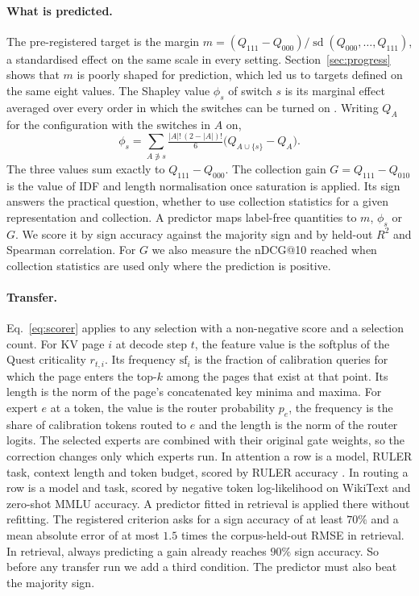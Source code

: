 \documentclass[11pt]{article}
\newcommand{\sfreq}{\mathrm{sf}}
\begin{document}
\paragraph{What is predicted.} The pre-registered target is the margin
$m = (Q_{111} - Q_{000})/\operatorname{sd}(Q_{000}, \ldots, Q_{111})$, a standardised
effect on the same scale in every setting. Section~\ref{sec:progress} shows that $m$ is
poorly shaped for prediction, which led us to targets defined on the same eight values.
The Shapley value $\phi_s$ of switch $s$ is its marginal effect averaged over every order
in which the switches can be turned on \citep{shapley1953value}. Writing $Q_A$ for the
configuration with the switches in $A$ on,
\begin{equation}
\phi_s = \sum_{A \not\ni s}
\tfrac{|A|!\,(2-|A|)!}{6}\bigl(Q_{A\cup\{s\}} - Q_{A}\bigr).
\label{eq:shapley}
\end{equation}
The three values sum exactly to $Q_{111} - Q_{000}$. The collection gain
$G = Q_{111} - Q_{010}$ is the value of IDF and length normalisation once saturation is
applied. Its sign answers the practical question, whether to use collection statistics
for a given representation and collection. A predictor maps label-free quantities to
$m$, $\phi_s$ or $G$. We score it by sign accuracy against the majority sign and by
held-out $R^2$ and Spearman correlation. For $G$ we also measure the nDCG@10 reached when
collection statistics are used only where the prediction is positive.

\paragraph{Transfer.} Eq.~\eqref{eq:scorer} applies to any selection with a non-negative
score and a selection count. For KV page $i$ at decode step $t$, the feature value is the
softplus of the Quest criticality $r_{t,i}$. Its frequency $\sfreq_i$ is the fraction of
calibration queries for which the page enters the top-$k$ among the pages that exist at
that point. Its length is the norm of the page's concatenated key minima and maxima. For
expert $e$ at a token, the value is the router probability $p_e$, the frequency is the
share of calibration tokens routed to $e$ and the length is the norm of the router logits.
The selected experts are combined with their original gate weights, so the correction
changes only which experts run. In attention a row is a model, RULER task, context length
and token budget, scored by RULER accuracy \citep{hsieh2024ruler}. In routing a row is a model and task, scored
by negative token log-likelihood on WikiText and zero-shot MMLU accuracy. A predictor
fitted in retrieval is applied there without refitting. The registered criterion asks
for a sign accuracy of at least $70\%$ and a mean absolute error of at most $1.5$ times the
corpus-held-out RMSE in retrieval. In retrieval, always predicting a gain already reaches
$90\%$ sign accuracy. So before any transfer run we add a third condition. The predictor
must also beat the majority sign.
\end{document}
